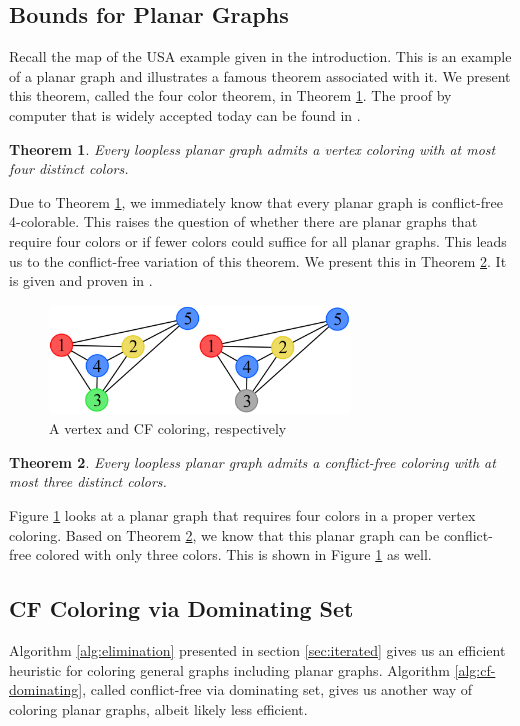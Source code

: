 \documentclass{sig-alternate}
\newtheorem{theorem}{Theorem}
\begin{document}
\subsection{Bounds for Planar Graphs}
\label{sec:bounds}
Recall the map of the USA example given in the introduction. This is an example of a planar graph and illustrates a famous theorem associated with it. We present this theorem, called the four color theorem, in Theorem \ref{thm:four}. The proof by computer that is widely accepted today can be found in \cite{robertson1997four}.

\begin{theorem} \label{thm:four}
Every loopless planar graph admits a vertex coloring with at most four distinct colors.
\end{theorem}

Due to Theorem \ref{thm:four}, we immediately know that every planar graph is conflict-free 4-colorable. This raises the question of whether there are planar graphs that require four colors or if fewer colors could suffice for all planar graphs. This leads us to the conflict-free variation of this theorem. We present this in Theorem \ref{thm:four-cf}. It is given and proven in \cite{abel2017three}.

\begin{figure}[h]
	\centering
	\includegraphics[width=8cm,trim=4 4 4 4,clip]{../figures/four.pdf}
	\caption{A vertex and CF coloring, respectively}\label{fig:four}
\end{figure}

\begin{theorem} \label{thm:four-cf}
Every loopless planar graph admits a conflict-free coloring with at most three distinct colors.
\end{theorem}

Figure \ref{fig:four} looks at a planar graph that requires four colors in a proper vertex coloring. Based on Theorem \ref{thm:four-cf}, we know that this planar graph can be conflict-free colored with only three colors. This is shown in Figure \ref{fig:four} as well.

\subsection{CF Coloring via Dominating Set}
\label{sec:coloring-dom}
Algorithm \ref{alg:elimination} presented in section \ref{sec:iterated} gives us an efficient heuristic for coloring general graphs including planar graphs. Algorithm \ref{alg:cf-dominating}, called conflict-free via dominating set, gives us another way of coloring planar graphs, albeit likely less efficient.
\end{document}

